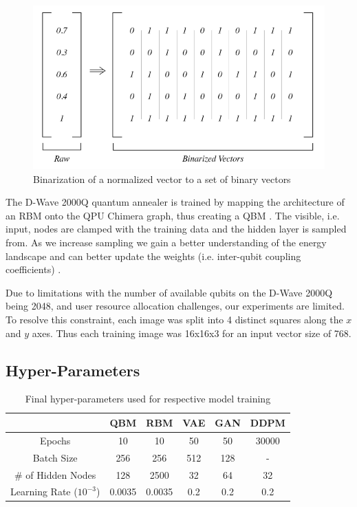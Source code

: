 \documentclass[%
 reprint,
 amsmath,amssymb,
 aps,
]{revtex4-2}
\begin{document}
\begin{figure}[h]
    \includegraphics[width=0.9\columnwidth]{binarize.png}
    \caption{\label{fig: binarize} Binarization of a normalized vector to a set of binary vectors \cite{Jain2020}}
\end{figure}


The D-Wave 2000Q quantum annealer is trained by mapping the architecture of an RBM onto the QPU Chimera graph, thus creating a QBM \cite{dwavedocs}. The visible, i.e. input, nodes are clamped with the training data and the hidden layer is sampled from. As we increase sampling we gain a better understanding of the energy landscape and can better update the weights (i.e. inter-qubit coupling coefficients) \cite{Jain2020}.


Due to limitations with the number of available qubits on the D-Wave 2000Q being 2048, and user resource allocation challenges, our experiments are limited. To resolve this constraint, each image was split into 4 distinct squares along the $x$ and $y$ axes. Thus each training image was 16x16x3 for an input vector size of 768.

\subsection{Hyper-Parameters}

\begin{table}[h]
\caption{\label{tab:hyperparams} Final hyper-parameters used for respective model training}
\begin{ruledtabular}
\begin{tabular}{cccccc}
& QBM & RBM & VAE & GAN & DDPM\\\hline
 Epochs & 10 & 10 & 50 & 50 & 30000\\ \hline
 Batch Size & 256 & 256 & 512 & 128 & - \\ \hline
 \# of Hidden Nodes & 128 & 2500 & 32 & 64 & 32 \\ \hline
 Learning Rate ($10^{-3}$) & 0.0035 & 0.0035 & 0.2 & 0.2 & 0.2
\end{tabular}
\end{ruledtabular}
\end{table}
\end{document}
